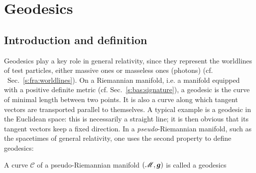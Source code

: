 \chapter{Geodesics} \label{s:geo}

\minitoc

\section{Introduction and definition}

Geodesics play a key role in general relativity, since they represent
the worldlines of test particles, either massive ones or masseless ones (photons)
(cf. ~Sec.~\ref{s:fra:worldlines}).
On a Riemannian manifold, i.e. a manifold equipped with a positive definite metric
(cf. Sec.~\ref{s:bas:signature}), a geodesic is the curve of minimal length between
two points. It is also a curve along which tangent vectors are transported parallel
to themselves. A typical example is a geodesic in the Euclidean space: this is
necessarily a straight line; it is then obvious that its tangent vectors
keep a fixed direction. In a \emph{pseudo}-Riemannian manifold, such as the
spacetimes of general relativity, one uses
the second property to define geodesics:
\begin{greybox}
A curve $\mathscr{C}$ of a pseudo-Riemannian manifold $(\mathscr{M},\bm{g})$ is
called a geodesics
\end{greybox}



